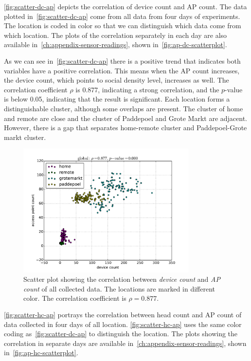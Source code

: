 	\autoref{fig:scatter-dc-ap} depicts the correlation of device count and \ac{AP} count. The data plotted in~\autoref{fig:scatter-dc-ap} come from all data from four days of experiments. The location is coded in color so that we can distinguish which data come from which location. The plots of the correlation separately in each day are also available in~\autoref{ch:appendix-sensor-readings}, shown in~\autoref{fig:ap-dc-scatterplot}.
	
	As we can see in~\autoref{fig:scatter-dc-ap} there is a positive trend that indicates both variables have a positive correlation. This means when the \ac{AP} count increases, the device count, which points to social density level, increases as well. The correlation coefficient $\rho$ is 0.877, indicating a strong correlation, and the $p$-value is below 0.05, indicating that the result is significant.
		Each location forms a distinguishable cluster, although some overlaps are present.
	The cluster of home and remote are close and the cluster of Paddepoel and Grote Markt are adjacent. However, there is a gap that separates home-remote cluster and Paddepoel-Grote markt cluster.

	\begin{figure}[h]
		\centering
		\includegraphics[width=0.8\textwidth]{./img/result/global-pr-vs-ap}
		\caption[Scatter plot of device and \ac{AP} count.]
		{Scatter plot showing the correlation between \textit{device count} and \textit{\ac{AP} count} of all collected data. The locations are marked in different color. The correlation coefficient is $\rho=0.877$.}
		\label{fig:scatter-dc-ap}
	\end{figure}

	\autoref{fig:scatter-hc-ap} portrays the correlation between head count and \ac{AP} count of data collected in four days of all location. \autoref{fig:scatter-hc-ap} uses the same color coding as~\autoref{fig:scatter-dc-ap} to distinguish the location. The plots showing the correlation in separate days are available in~\autoref{ch:appendix-sensor-readings}, shown in~\autoref{fig:ap-hc-scatterplot}.
	
